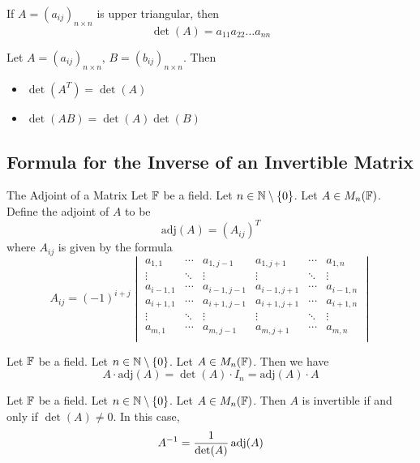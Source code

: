 \documentclass[a4paper]{article}
\begin{document}
\begin{prp}{}{} If $A=(a_{ij})_{n\times n}$ is upper triangular, then $$\det(A)=a_{11}a_{22}\dots a_{nn}$$
\end{prp}

\begin{prp}{}{} Let $A=(a_{ij})_{n\times n}$, $B=(b_{ij})_{n\times n}$. Then 
\begin{itemize}
\item $\det(A^T)=\det(A)$
\item $\det(AB)=\det(A)\det(B)$
\end{itemize}
\end{prp}

\subsection{Formula for the Inverse of an Invertible Matrix}
\begin{defn}{The Adjoint of a Matrix}{} Let $\mathbb{F}$ be a field. Let $n\in\mathbb{N}\setminus\{0\}$. Let $A\in M_n(\mathbb{F})$. Define the adjoint of $A$ to be $$\text{adj}(A)=(A_{ij})^T$$ where $A_{ij}$ is given by the formula $$A_{ij}=(-1)^{i+j}\begin{vmatrix}
a_{1,1} & \cdots & a_{1,j-1} & a_{1,j+1} & \cdots & a_{1,n}\\
\vdots & \ddots & \vdots & \vdots & \ddots & \vdots\\
a_{i-1,1} & \cdots & a_{i-1,j-1} & a_{i-1,j+1} & \cdots & a_{i-1,n}\\
a_{i+1,1} & \cdots & a_{i+1,j-1} & a_{i+1,j+1} & \cdots & a_{i+1,n}\\
\vdots & \ddots & \vdots & \vdots & \ddots & \vdots\\
a_{m,1} & \cdots & a_{m,j-1} & a_{m,j+1} & \cdots & a_{m,n}\\
\end{vmatrix}$$
\end{defn}

\begin{prp}{}{} Let $\mathbb{F}$ be a field. Let $n\in\mathbb{N}\setminus\{0\}$. Let $A\in M_n(\mathbb{F})$. Then we have $$A\cdot\text{adj}(A)=\det(A)\cdot I_n=\text{adj}(A)\cdot A$$
\end{prp}

\begin{thm}{}{} Let $\mathbb{F}$ be a field. Let $n\in\mathbb{N}\setminus\{0\}$. Let $A\in M_n(\mathbb{F})$. Then $A$ is invertible if and only if $\det(A)\neq 0$. In this case, $$A^{-1}=\frac{1}{\det(A)}\operatorname{adj}(A)$$
\end{thm}
\end{document}
